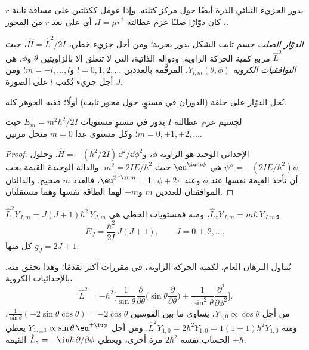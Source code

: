 يدور الجزيء الثنائي الذرة أيضًا حول مركز كتلته. وإذا عومل ككتلتين
على مسافة ثابتة $r$، كان دوّارًا صلبًا عزم عطالته
$I = \mu r^2$، أي  على بعد $r$ من المحور.

\begin{definition}\label{def:b3:quantum-model-systems:rotor}
\emph{الدوّار الصلب} جسم ثابت الشكل يدور
بحرية؛ ومن أجل جزيء خطي، $\hat H = \hat L^2/2I$، حيث $\hat L^2$
 مربع كمية الحركة الزاوية. ودواله الذاتية، التي
لا تتعلق إلا بالزاويتين $\theta$ و$\phi$، هي \emph{التوافقيات
الكروية} $Y_{l,m}(\theta,\phi)$، المرقَّمة بالعددين $l =
0, 1, 2, \dots$ و$m = -l, \dots, l$؛ ومن أجل جزيء يُكتب $l$ على الصورة $J$.
\end{definition}

يُحل الدوّار على حلقة (الدوران في مستوٍ، حول محور ثابت)
أولًا؛ ففيه الجوهر كله.

\begin{theorem}[الحلقة]\label{thm:b3:quantum-model-systems:ring}
لجسيم عزم عطالته $I$ يدور في مستوٍ مستويات
$E_m = m^2\hbar^2/2I$ حيث $m = 0, \pm1, \pm2, \dots$؛ وكل مستوى عدا $m = 0$
منحل مرتين.
\end{theorem}

\begin{proof}
الإحداثي الوحيد هو الزاوية $\phi$، و$\hat H = -(\hbar^2/2I)\,
\dd^2/\dd\phi^2$. وحلول $\psi'' = -(2IE/\hbar^2)\psi$ هي $\eu^{\iu
m\phi}$ حيث $m^2 = 2IE/\hbar^2$. والدالة الوحيدة القيمة يجب أن تأخذ القيمة نفسها
عند $\phi$ وعند $\phi + 2\pi$: $\eu^{2\pi\iu m} = 1$، فالعدد $m$ صحيح.
والدالتان الموافقتان للعددين $m$ و$-m$ لهما الطاقة نفسها وهما مستقلتان.
\end{proof}

\begin{theorem}\label{thm:b3:quantum-model-systems:rotor}
$\hat L^2Y_{J,m} = J(J+1)\hbar^2\,Y_{J,m}$ و$\hat L_zY_{J,m} = m\hbar\,
Y_{J,m}$، ومنه فمستويات  الخطي هي
\[
E_J = \frac{\hbar^2}{2I}\,J(J+1), \qquad J = 0, 1, 2, \dots,
\]
 كل منها $g_J = 2J + 1$.
\end{theorem}
\admitted

يُتناول البرهان العام،  لكمية الحركة الزاوية، في
مقررات أكثر تقدمًا؛ وهذا تحقق منه. بالإحداثيات الكروية،
\[
\hat L^2 = -\hbar^2\Big[\frac{1}{\sin\theta}\frac{\partial}{\partial\theta}
\Big(\sin\theta\frac{\partial}{\partial\theta}\Big) +
\frac{1}{\sin^2\theta}\frac{\partial^2}{\partial\phi^2}\Big].
\]
من أجل $Y_{1,0} \propto \cos\theta$، يساوي ما بين القوسين $\frac{1}{\sin\theta}(-2\sin\theta
\cos\theta) = -2\cos\theta$، ومنه $\hat L^2Y_{1,0} = 2\hbar^2Y_{1,0} = 1(1+1)\hbar^2
Y_{1,0}$. ومن أجل $Y_{1,\pm1} \propto \sin\theta\,\eu^{\pm\iu\phi}$ يعطي
الحساب نفسه $2\hbar^2$ مرة أخرى، ويعطي $\hat L_z = -\iu\hbar\,\partial/\partial
\phi$ القيمة $\pm\hbar$.

